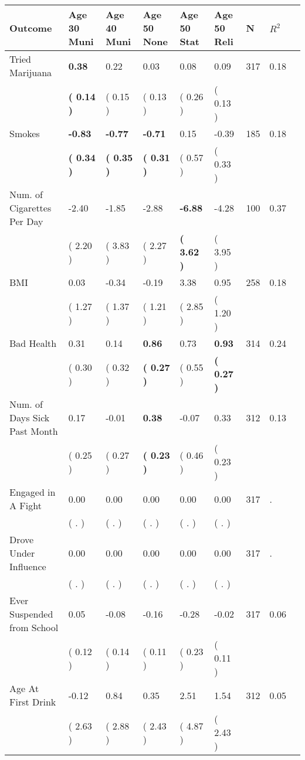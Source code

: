 \begin{tabular}{L{6.2cm} C{1.8cm} C{1.8cm} C{1.8cm} C{1.8cm} C{1.8cm} C{1.8cm} C{0.3cm} C{0.3cm}}
\toprule
 \textbf{Outcome} & \textbf{Age 30 Muni} & \textbf{Age 40 Muni} & \textbf{Age 50 None} & \textbf{Age 50 Stat} & \textbf{Age 50 Reli} & \textbf{N} & \textbf{$ R^2$} \\
\midrule
Tried Marijuana & \textbf{     0.38} &      0.22 &      0.03 &      0.08 &      0.09  & 317 &       0.18 \\ 
 & \textbf{(     0.14 )} & (     0.15 ) & (     0.13 ) & (     0.26 ) & (     0.13 )  & \\
Smokes & \textbf{    -0.83} & \textbf{    -0.77} & \textbf{    -0.71} &      0.15 &     -0.39  & 185 &       0.18 \\ 
 & \textbf{(     0.34 )} & \textbf{(     0.35 )} & \textbf{(     0.31 )} & (     0.57 ) & (     0.33 )  & \\
Num. of Cigarettes Per Day &     -2.40 &     -1.85 &     -2.88 & \textbf{    -6.88} &     -4.28  & 100 &       0.37 \\ 
 & (     2.20 ) & (     3.83 ) & (     2.27 ) & \textbf{(     3.62 )} & (     3.95 )  & \\
BMI &      0.03 &     -0.34 &     -0.19 &      3.38 &      0.95  & 258 &       0.18 \\ 
 & (     1.27 ) & (     1.37 ) & (     1.21 ) & (     2.85 ) & (     1.20 )  & \\
Bad Health &      0.31 &      0.14 & \textbf{     0.86} &      0.73 & \textbf{     0.93}  & 314 &       0.24 \\ 
 & (     0.30 ) & (     0.32 ) & \textbf{(     0.27 )} & (     0.55 ) & \textbf{(     0.27 )}  & \\
Num. of Days Sick Past Month &      0.17 &     -0.01 & \textbf{     0.38} &     -0.07 &      0.33  & 312 &       0.13 \\ 
 & (     0.25 ) & (     0.27 ) & \textbf{(     0.23 )} & (     0.46 ) & (     0.23 )  & \\
Engaged in A Fight &      0.00 &      0.00 &      0.00 &      0.00 &      0.00  & 317 &          . \\ 
 & (        . ) & (        . ) & (        . ) & (        . ) & (        . )  & \\
Drove Under Influence &      0.00 &      0.00 &      0.00 &      0.00 &      0.00  & 317 &          . \\ 
 & (        . ) & (        . ) & (        . ) & (        . ) & (        . )  & \\
Ever Suspended from School &      0.05 &     -0.08 &     -0.16 &     -0.28 &     -0.02  & 317 &       0.06 \\ 
 & (     0.12 ) & (     0.14 ) & (     0.11 ) & (     0.23 ) & (     0.11 )  & \\
Age At First Drink &     -0.12 &      0.84 &      0.35 &      2.51 &      1.54  & 312 &       0.05 \\ 
 & (     2.63 ) & (     2.88 ) & (     2.43 ) & (     4.87 ) & (     2.43 )  & \\
\bottomrule
\end{tabular}
